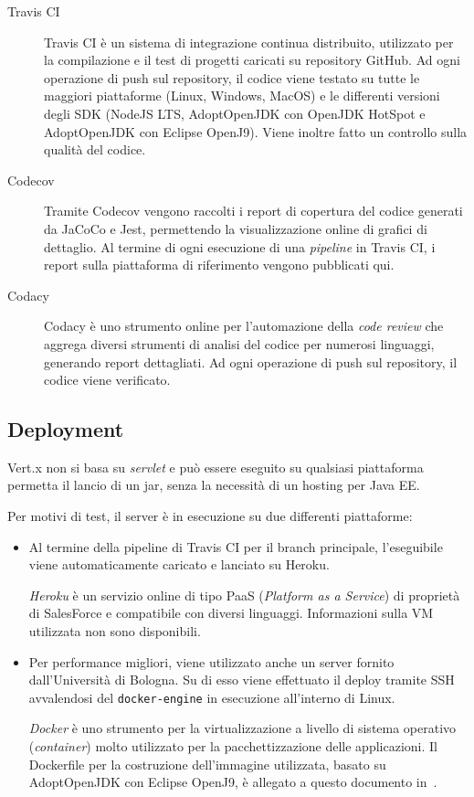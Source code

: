     \begin{description}
      \item[Travis CI]
        Travis CI è un sistema di integrazione continua distribuito, utilizzato per la compilazione e il test di progetti caricati su repository GitHub.
        Ad ogni operazione di push sul repository, il codice viene testato su tutte le maggiori piattaforme (Linux, Windows, MacOS) e le differenti versioni degli SDK (NodeJS LTS, AdoptOpenJDK con OpenJDK HotSpot e AdoptOpenJDK con Eclipse OpenJ9).
        Viene inoltre fatto un controllo sulla qualità del codice.

      \item[Codecov]
        Tramite Codecov vengono raccolti i report di copertura del codice generati da JaCoCo e Jest, permettendo la visualizzazione online di grafici di dettaglio.
        Al termine di ogni esecuzione di una \emph{pipeline} in Travis CI, i report sulla piattaforma di riferimento vengono pubblicati qui.

      \item[Codacy]
        Codacy è uno strumento online per l'automazione della \emph{code review} che aggrega diversi strumenti di analisi del codice per numerosi linguaggi, generando report dettagliati.
        Ad ogni operazione di push sul repository, il codice viene verificato.
    \end{description}

  \subsection{Deployment}
    Vert.x non si basa su \emph{servlet} e può essere eseguito su qualsiasi piattaforma permetta il lancio di un jar, senza la necessità di un hosting per Java EE\@.

    Per motivi di test, il server è in esecuzione su due differenti piattaforme:

    \begin{itemize}
      \item
        Al termine della pipeline di Travis CI per il branch principale, l'eseguibile viene automaticamente caricato e lanciato su Heroku.

        \emph{Heroku} è un servizio online di tipo PaaS (\emph{\emph{P}latform as a \emph{S}ervice}) di proprietà di SalesForce e compatibile con diversi linguaggi.
        Informazioni sulla VM utilizzata non sono disponibili.
      \item
        Per performance migliori, viene utilizzato anche un server fornito dall'Università di Bologna.
        Su di esso viene effettuato il deploy tramite SSH avvalendosi del \texttt{docker-engine} in esecuzione all'interno di Linux.

        \emph{Docker} è uno strumento per la virtualizzazione a livello di sistema operativo (\emph{container}) molto utilizzato per la pacchettizzazione delle applicazioni.
        Il Dockerfile per la costruzione dell'immagine utilizzata, basato su AdoptOpenJDK con Eclipse OpenJ9, è allegato a questo documento in~.
    \end{itemize}


